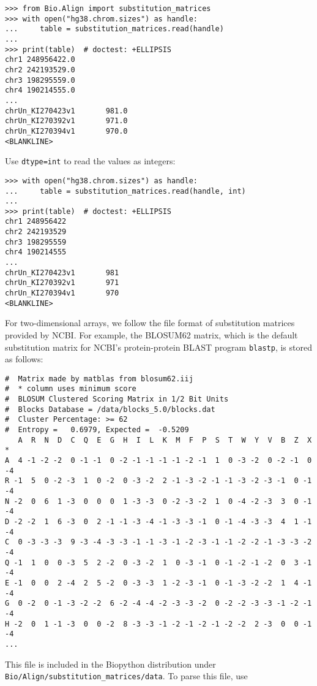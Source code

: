 \begin{verbatim}
>>> from Bio.Align import substitution_matrices
>>> with open("hg38.chrom.sizes") as handle:
...     table = substitution_matrices.read(handle)
...
>>> print(table)  # doctest: +ELLIPSIS
chr1 248956422.0
chr2 242193529.0
chr3 198295559.0
chr4 190214555.0
...
chrUn_KI270423v1       981.0
chrUn_KI270392v1       971.0
chrUn_KI270394v1       970.0
<BLANKLINE>
\end{verbatim}
Use \verb+dtype=int+ to read the values as integers:

\begin{verbatim}
>>> with open("hg38.chrom.sizes") as handle:
...     table = substitution_matrices.read(handle, int)
...
>>> print(table)  # doctest: +ELLIPSIS
chr1 248956422
chr2 242193529
chr3 198295559
chr4 190214555
...
chrUn_KI270423v1       981
chrUn_KI270392v1       971
chrUn_KI270394v1       970
<BLANKLINE>
\end{verbatim}

For two-dimensional arrays, we follow the file format of substitution matrices provided by NCBI. For example, the BLOSUM62 matrix, which is the default substitution matrix for NCBI's protein-protein BLAST \cite{altschul1990} program \verb+blastp+, is stored as follows:
\begin{verbatim}
#  Matrix made by matblas from blosum62.iij
#  * column uses minimum score
#  BLOSUM Clustered Scoring Matrix in 1/2 Bit Units
#  Blocks Database = /data/blocks_5.0/blocks.dat
#  Cluster Percentage: >= 62
#  Entropy =   0.6979, Expected =  -0.5209
   A  R  N  D  C  Q  E  G  H  I  L  K  M  F  P  S  T  W  Y  V  B  Z  X  *
A  4 -1 -2 -2  0 -1 -1  0 -2 -1 -1 -1 -1 -2 -1  1  0 -3 -2  0 -2 -1  0 -4
R -1  5  0 -2 -3  1  0 -2  0 -3 -2  2 -1 -3 -2 -1 -1 -3 -2 -3 -1  0 -1 -4
N -2  0  6  1 -3  0  0  0  1 -3 -3  0 -2 -3 -2  1  0 -4 -2 -3  3  0 -1 -4
D -2 -2  1  6 -3  0  2 -1 -1 -3 -4 -1 -3 -3 -1  0 -1 -4 -3 -3  4  1 -1 -4
C  0 -3 -3 -3  9 -3 -4 -3 -3 -1 -1 -3 -1 -2 -3 -1 -1 -2 -2 -1 -3 -3 -2 -4
Q -1  1  0  0 -3  5  2 -2  0 -3 -2  1  0 -3 -1  0 -1 -2 -1 -2  0  3 -1 -4
E -1  0  0  2 -4  2  5 -2  0 -3 -3  1 -2 -3 -1  0 -1 -3 -2 -2  1  4 -1 -4
G  0 -2  0 -1 -3 -2 -2  6 -2 -4 -4 -2 -3 -3 -2  0 -2 -2 -3 -3 -1 -2 -1 -4
H -2  0  1 -1 -3  0  0 -2  8 -3 -3 -1 -2 -1 -2 -1 -2 -2  2 -3  0  0 -1 -4
...
\end{verbatim}
This file is included in the Biopython distribution under \verb+Bio/Align/substitution_matrices/data+. To parse this file, use

